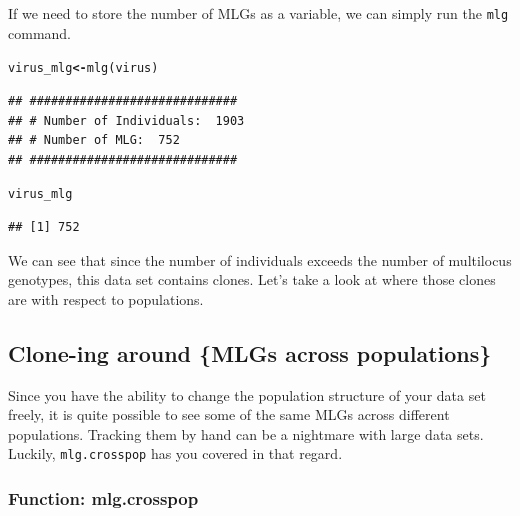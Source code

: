 \documentclass[letterpaper]{article}\usepackage[]{graphicx}\usepackage[]{color}
\makeatletter
\newcommand{\hlstd}[1]{\textcolor[rgb]{0,0,0}{#1}}%
\newcommand{\hlkwb}[1]{\textcolor[rgb]{0.502,0.502,0.753}{\textbf{#1}}}%
\newcommand{\hlkwd}[1]{\textcolor[rgb]{0,0.267,0.4}{#1}}%
\newenvironment{kframe}{%
 \def\at@end@of@kframe{}%
 \ifinner\ifhmode%
  \def\at@end@of@kframe{\end{minipage}}%
  \begin{minipage}{\columnwidth}%
 \fi\fi%
 \def\FrameCommand##1{\hskip\@totalleftmargin \hskip-\fboxsep
 \colorbox{shadecolor}{##1}\hskip-\fboxsep
     \hskip-\linewidth \hskip-\@totalleftmargin \hskip\columnwidth}%
 \MakeFramed {\advance\hsize-\width
   \@totalleftmargin\z@ \linewidth\hsize
   \@setminipage}}%
 {\par\unskip\endMakeFramed%
 \at@end@of@kframe}
\newenvironment{knitrout}{}{} %
\newcommand{\tab}{\hspace*{1em}}
\makeatother
\begin{document}
\noindent
If we need to store the number of MLGs as a variable, we can simply run the \texttt{mlg} command.
\begin{knitrout}\footnotesize
{}\color{fgcolor}\begin{kframe}
\begin{alltt}
\hlstd{virus_mlg} \hlkwb{<-} \hlkwd{mlg}\hlstd{(virus)}
\end{alltt}
\begin{verbatim}
## #############################
## # Number of Individuals:  1903 
## # Number of MLG:  752 
## #############################
\end{verbatim}
\begin{alltt}
\hlstd{virus_mlg}
\end{alltt}
\begin{verbatim}
## [1] 752
\end{verbatim}
\end{kframe}
\end{knitrout}

\label{mlg:mlg:mlg}

We can see that since the number of individuals exceeds the number of multilocus genotypes, this data set contains clones. Let's take a look at where those clones are with respect to populations.
%
\subsection{Clone-ing around \{MLGs across populations\}}
\label{mlg:cross}

\tab\tab Since you have the ability to change the population structure of your data set freely, it is quite possible to see some of the same MLGs across different populations. Tracking them by hand can be a nightmare with large data sets. Luckily, \texttt{mlg.crosspop} has you covered in that regard.
\subsubsection{Function: mlg.crosspop}
\label{mlg:cross:mlg.crosspop}
\end{document}
